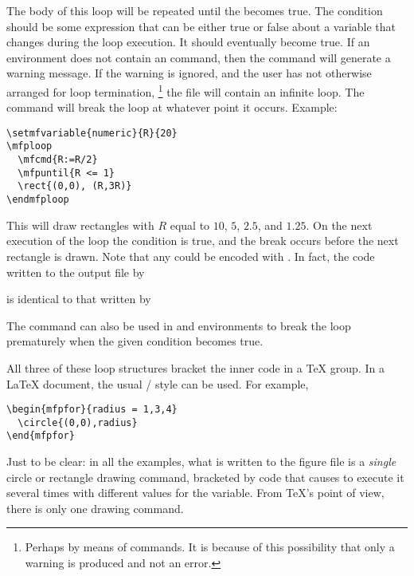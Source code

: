 \documentclass[letterpaper]{article}
\begin{document}
The body of this loop will be repeated until the 
becomes true. The condition should be some expression that can be either
true or false about a variable that changes during the loop execution.
It should eventually become true. If an  environment does
not contain an  command, then the  command
will generate a warning message. If the warning is ignored, and the user
has not otherwise arranged for loop termination,%
    \footnote{Perhaps by means of  commands. It is because of
    this possibility that only a warning is produced and not an error.}
the  file will contain an infinite loop. The 
command will break the loop at whatever point it occurs. Example:
\begin{verbatim}
\setmfvariable{numeric}{R}{20}
\mfploop
  \mfcmd{R:=R/2}
  \mfpuntil{R <= 1}
  \rect{(0,0), (R,3R)}
\endmfploop
\end{verbatim}
This will draw rectangles with $R$ equal to $10$, $5$, $2.5$, and
$1.25$. On the next execution of the loop the condition  is
true, and the break occurs before the next rectangle is drawn. Note that
any  could be encoded with . In fact, the code
written to the output file by
\begin{display}
\end{display}
is identical to that written by
\begin{display}
\end{display}

The command  can also be used in  and
 environments to break the loop prematurely when the given
condition becomes true.

All three of these loop structures bracket the inner code in a \TeX{}
group. In a \LaTeX{} document, the usual \slash{} style can
be used. For example,
\begin{verbatim}
\begin{mfpfor}{radius = 1,3,4}
  \circle{(0,0),radius}
\end{mfpfor}
\end{verbatim}

Just to be clear: in all the examples, what is written to the figure
file is a \emph{single} circle or rectangle drawing command, bracketed
by code that causes \MF{} to execute it several times with different
values for the variable. From \TeX{}'s point of view, there is only one
\mfp{} drawing command.
\end{document}

